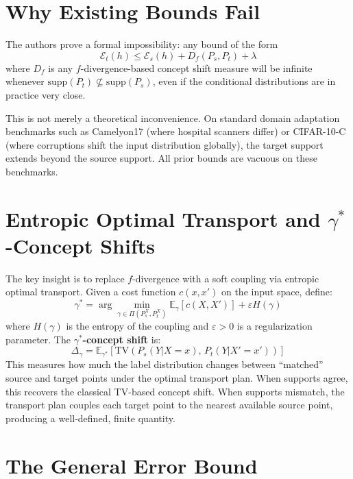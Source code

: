 \documentclass[10pt,twocolumn]{article}
\begin{document}
\section{Why Existing Bounds Fail}

The authors prove a formal impossibility: any bound of the form
\[
  \mathcal{E}_t(h) \leq \mathcal{E}_s(h) + D_f(P_s, P_t) + \lambda
\]
where $D_f$ is any $f$-divergence-based concept shift measure will be
infinite whenever $\mathrm{supp}(P_t) \not\subseteq \mathrm{supp}(P_s)$,
even if the conditional distributions are in practice very close.

This is not merely a theoretical inconvenience. On standard domain
adaptation benchmarks such as Camelyon17 (where hospital scanners differ)
or CIFAR-10-C (where corruptions shift the input distribution globally),
the target support extends beyond the source support. All prior bounds
are vacuous on these benchmarks.

\section{Entropic Optimal Transport and $\gamma^*$-Concept Shifts}

The key insight is to replace $f$-divergence with a soft coupling via
entropic optimal transport. Given a cost function $c(x, x')$ on the
input space, define:
\[
  \gamma^* = \arg\min_{\gamma \in \Pi(P_s^X, P_t^X)}
  \mathbb{E}_\gamma[c(X,X')] + \varepsilon H(\gamma)
\]
where $H(\gamma)$ is the entropy of the coupling and $\varepsilon > 0$
is a regularization parameter. The \textbf{$\gamma^*$-concept shift} is:
\[
  \Delta_\gamma = \mathbb{E}_{\gamma^*}\!\left[
    \mathrm{TV}\!\left(P_s(Y|X{=}x),\, P_t(Y|X'{=}x')\right)
  \right]
\]
This measures how much the label distribution changes between
``matched'' source and target points under the optimal transport plan.
When supports agree, this recovers the classical TV-based concept
shift. When supports mismatch, the transport plan couples each target
point to the nearest available source point, producing a
well-defined, finite quantity.

\section{The General Error Bound}
\end{document}
